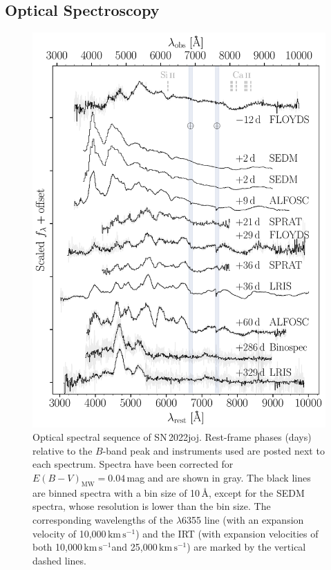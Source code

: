 \documentclass[twocolumn]{aastex631}
\newcommand{\sn}{SN\,2022joj}
\newcommand{\kms}{$\mathrm{km}\,\mathrm{s}^{-1}$}
\begin{document}
\begin{CJK*}{UTF8}{gbsn}
\subsection{Optical Spectroscopy}\label{sec:optical_spec}
\begin{figure}
    \centering
    \includegraphics[width=\linewidth]{SN2022joj_spectral_sequence.pdf}
    \caption{Optical spectral sequence of \sn. Rest-frame phases (days) relative to the $B$-band peak and instruments used are posted next to each spectrum. Spectra have been corrected for $E(B-V)_\mathrm{MW} = 0.04$\,mag and are shown in gray. The black lines are binned spectra with a bin size of 10\,\AA, except for the SEDM spectra, whose resolution is lower than the bin size. The corresponding wavelengths of the  $\lambda$6355 line (with an expansion velocity of 10,000\,\kms) and the  IRT (with expansion velocities of both 10,000\,\kms and 25,000\,\kms) are marked by the vertical dashed lines.}
    \label{fig:spec_seq}
\end{figure}


\end{CJK*}
\end{document}
